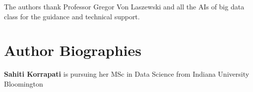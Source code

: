 \documentclass[9pt,twocolumn,twoside]{styles/osajnl}
\begin{document}
The authors thank Professor Gregor Von Laszewski and all the AIs of big data class for the guidance and technical support.



 
\section*{Author Biographies}
\begingroup
\setlength\intextsep{0pt}
\begin{minipage}[t][3.2cm][t]{1.0\columnwidth} %
  \noindent
  {\bfseries Sahiti Korrapati} is pursuing her MSc in Data Science from
  Indiana University Bloomington
\end{minipage}
\endgroup
\end{document}
